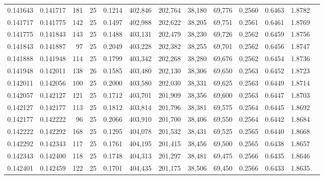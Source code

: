 \begin{tabular}{rrrrrrrrrrrrr}
0.141643 & 0.141717 &   181 &  25 &                                     0.1214 & 402,846 & 202,764 &  38,180 &  69,776 & 0.2560 & 0.6463 & 1.8782 \\
0.141717 & 0.141775 &   142 &  25 &                                     0.1497 & 402,988 & 202,622 &  38,205 &  69,751 & 0.2561 & 0.6461 & 1.8769 \\
0.141775 & 0.141843 &   143 &  25 &                                     0.1488 & 403,131 & 202,479 &  38,230 &  69,726 & 0.2562 & 0.6459 & 1.8756 \\
0.141843 & 0.141887 &    97 &  25 &                                     0.2049 & 403,228 & 202,382 &  38,255 &  69,701 & 0.2562 & 0.6456 & 1.8747 \\
0.141888 & 0.141948 &   114 &  25 &                                     0.1799 & 403,342 & 202,268 &  38,280 &  69,676 & 0.2562 & 0.6454 & 1.8736 \\
0.141948 & 0.142011 &   138 &  26 &                                     0.1585 & 403,480 & 202,130 &  38,306 &  69,650 & 0.2563 & 0.6452 & 1.8723 \\
0.142011 & 0.142056 &   100 &  25 &                                     0.2000 & 403,580 & 202,030 &  38,331 &  69,625 & 0.2563 & 0.6449 & 1.8714 \\
0.142057 & 0.142127 &   121 &  25 &                                     0.1712 & 403,701 & 201,909 &  38,356 &  69,600 & 0.2563 & 0.6447 & 1.8703 \\
0.142127 & 0.142177 &   113 &  25 &                                     0.1812 & 403,814 & 201,796 &  38,381 &  69,575 & 0.2564 & 0.6445 & 1.8692 \\
0.142177 & 0.142222 &    96 &  25 &                                     0.2066 & 403,910 & 201,700 &  38,406 &  69,550 & 0.2564 & 0.6442 & 1.8684 \\
0.142222 & 0.142292 &   168 &  25 &                                     0.1295 & 404,078 & 201,532 &  38,431 &  69,525 & 0.2565 & 0.6440 & 1.8668 \\
0.142292 & 0.142343 &   117 &  25 &                                     0.1761 & 404,195 & 201,415 &  38,456 &  69,500 & 0.2565 & 0.6438 & 1.8657 \\
0.142343 & 0.142400 &   118 &  25 &                                     0.1748 & 404,313 & 201,297 &  38,481 &  69,475 & 0.2566 & 0.6435 & 1.8646 \\
0.142401 & 0.142459 &   122 &  25 &                                     0.1701 & 404,435 & 201,175 &  38,506 &  69,450 & 0.2566 & 0.6433 & 1.8635 \\

\end{tabular}
